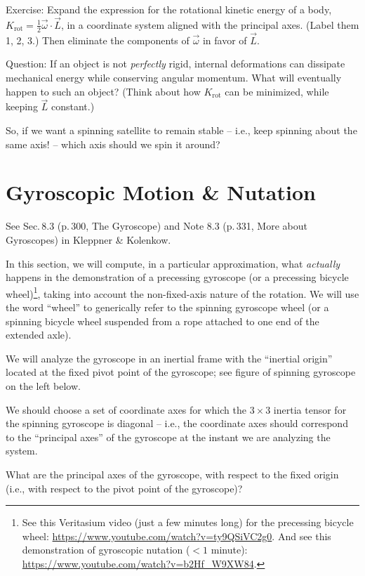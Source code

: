 \documentclass[11pt, letterpaper, openany]{book}
\newenvironment{exercise}[1][Exercise]{%
  \tcolorbox[blanker, breakable, left=1em,
    before skip=1em, after skip=1em,
    borderline west={3pt}{0pt}{PhysNavy},
    colback=PhysCream,
    before upper={\textcolor{PhysNavy}{\sffamily\bfseries #1:}\space}
  ]%
}{%
  \endtcolorbox%
}
\begin{document}
Exercise: Expand the expression for the rotational kinetic energy of a body, $K_{\text{rot}} = \frac{1}{2}\vec{\omega} \cdot \vec{L}$, in a coordinate system aligned with the principal axes. (Label them 1, 2, 3.) Then eliminate the components of $\vec{\omega}$ in favor of $\vec{L}$.

Question: If an object is not \textit{perfectly} rigid, internal deformations can dissipate mechanical energy while conserving angular momentum. What will eventually happen to such an object? (Think about how $K_{\text{rot}}$ can be minimized, while keeping $\vec{L}$ constant.)

So, if we want a spinning satellite to remain stable -- i.e., keep spinning about the same axis! -- which axis should we spin it around?

\chapter{Gyroscopic Motion \& Nutation}

See Sec.\,8.3 (p.\,300, The Gyroscope) and Note 8.3 (p.\,331, More about Gyroscopes) in Kleppner \& Kolenkow.

In this section, we will compute, in a particular approximation, what \textit{actually} happens in the demonstration of a precessing gyroscope (or a precessing bicycle wheel)\footnote{See this Veritasium video (just a few minutes long) for the precessing bicycle wheel: \url{https://www.youtube.com/watch?v=ty9QSiVC2g0}. And see this demonstration of gyroscopic nutation ($< 1$ minute): \url{https://www.youtube.com/watch?v=b2Hf_W9XW84}.}, taking into account the non-fixed-axis nature of the rotation. We will use the word ``wheel'' to generically refer to the spinning gyroscope wheel (or a spinning bicycle wheel suspended from a rope attached to one end of the extended axle).

We will analyze the gyroscope in an inertial frame with the ``inertial origin'' located at the fixed pivot point of the gyroscope; see figure of spinning gyroscope on the left below.

We should choose a set of coordinate axes for which the $3 \times 3$ inertia tensor for the spinning gyroscope is diagonal -- i.e., the coordinate axes should correspond to the ``principal axes'' of the gyroscope at the instant we are analyzing the system.

\begin{exercise}[Quick Exercise 1]
What are the principal axes of the gyroscope, with respect to the fixed origin (i.e., with respect to the pivot point of the gyroscope)? \\
\end{exercise}
\end{document}
